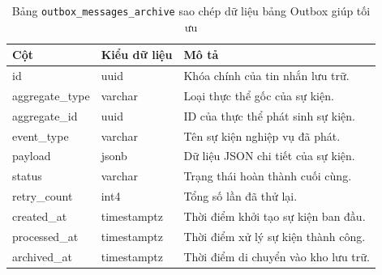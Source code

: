 \begin{table}[H]
\centering
\begin{tabular}{|l|l|p{6cm}|}
\hline
\textbf{Cột} & \textbf{Kiểu dữ liệu} & \textbf{Mô tả} \\ \hline
id & uuid & Khóa chính của tin nhắn lưu trữ. \\ \hline
aggregate\_type & varchar & Loại thực thể gốc của sự kiện. \\ \hline
aggregate\_id & uuid & ID của thực thể phát sinh sự kiện. \\ \hline
event\_type & varchar & Tên sự kiện nghiệp vụ đã phát. \\ \hline
payload & jsonb & Dữ liệu JSON chi tiết của sự kiện. \\ \hline
status & varchar & Trạng thái hoàn thành cuối cùng. \\ \hline
retry\_count & int4 & Tổng số lần đã thử lại. \\ \hline
created\_at & timestamptz & Thời điểm khởi tạo sự kiện ban đầu. \\ \hline
processed\_at & timestamptz & Thời điểm xử lý sự kiện thành công. \\ \hline
archived\_at & timestamptz & Thời điểm di chuyển vào kho lưu trữ. \\ \hline
\end{tabular}
\caption{Bảng \texttt{outbox\_messages\_archive} sao chép dữ liệu bảng Outbox giúp tối ưu}
\end{table}
